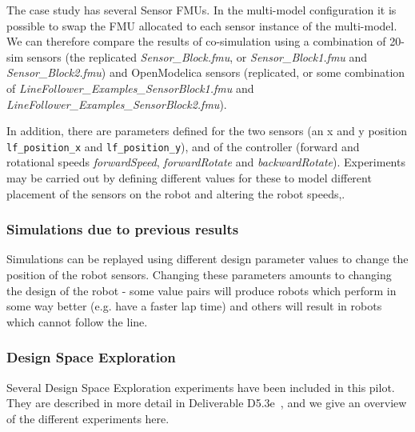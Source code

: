 The case study has several Sensor FMUs. In the multi-model configuration it is possible to swap the FMU allocated to each sensor instance of the multi-model. We can therefore compare the results of co-simulation using a combination of 20-sim sensors (the replicated \emph{Sensor\_Block.fmu}, or \emph{Sensor\_Block1.fmu} and \emph{Sensor\_Block2.fmu}) and OpenModelica sensors (replicated, or some combination of \emph{LineFollower\_Examples\_SensorBlock1.fmu} and \emph{LineFollower\_Examples\_SensorBlock2.fmu}). 

In addition, there are parameters defined for the two sensors (an x and y position \texttt{lf\_position\_x} and \texttt{lf\_position\_y}), and of the controller (forward and rotational speeds \emph{forwardSpeed}, \emph{forwardRotate} and \emph{backwardRotate}). Experiments may be carried out by defining different values for these to model different placement of the sensors on the robot and altering the robot speeds,. 

\subsubsection{Simulations due to previous results}

Simulations can be replayed using different design parameter values to change the position of the robot sensors. Changing these parameters amounts to changing the design of the robot - some value pairs will produce robots which perform in some way better (e.g. have a faster lap time) and others will result in robots which cannot follow the line.

\subsubsection{Design Space Exploration}

Several Design Space Exploration experiments have been included in this pilot. They are described in more detail in Deliverable D5.3e~\cite{INTOCPSD5.3e}, and we give an overview of the different experiments here. 

